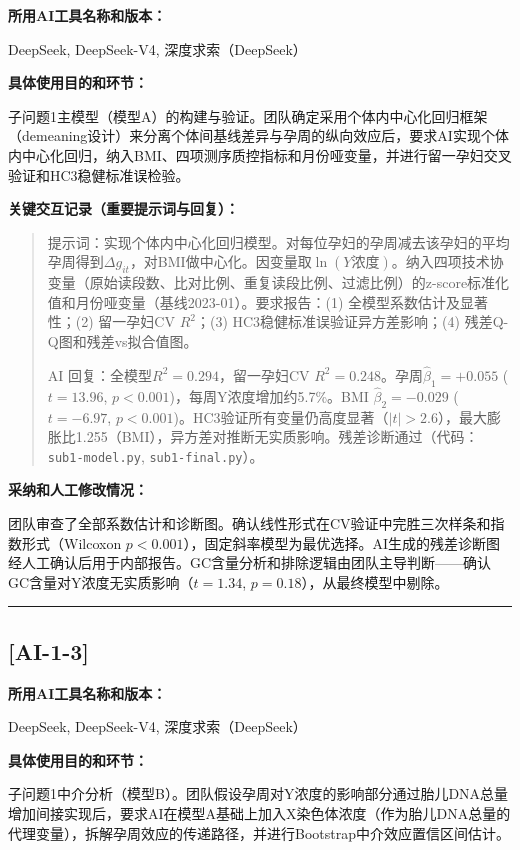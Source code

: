 \documentclass[12pt,a4paper]{ctexart}
\begin{document}
\textbf{所用AI工具名称和版本：}

DeepSeek, DeepSeek-V4, 深度求索（DeepSeek）

\textbf{具体使用目的和环节：}

子问题1主模型（模型A）的构建与验证。团队确定采用个体内中心化回归框架（demeaning设计）来分离个体间基线差异与孕周的纵向效应后，要求AI实现个体内中心化回归，纳入BMI、四项测序质控指标和月份哑变量，并进行留一孕妇交叉验证和HC3稳健标准误检验。

\textbf{关键交互记录（重要提示词与回复）：}

\begin{quote}
提示词：实现个体内中心化回归模型。对每位孕妇的孕周减去该孕妇的平均孕周得到$\Delta g_{it}$，对BMI做中心化。因变量取$\ln(Y\text{浓度})$。纳入四项技术协变量（原始读段数、比对比例、重复读段比例、过滤比例）的z-score标准化值和月份哑变量（基线2023-01）。要求报告：(1) 全模型系数估计及显著性；(2) 留一孕妇CV $R^2$；(3) HC3稳健标准误验证异方差影响；(4) 残差Q-Q图和残差vs拟合值图。

AI 回复：全模型$R^2=0.294$，留一孕妇CV $R^2=0.248$。孕周$\hat{\beta}_1=+0.055$ ($t=13.96$, $p<0.001$)，每周Y浓度增加约5.7\%。BMI $\hat{\beta}_2=-0.029$ ($t=-6.97$, $p<0.001$)。HC3验证所有变量仍高度显著（$|t|>2.6$），最大膨胀比1.255（BMI），异方差对推断无实质影响。残差诊断通过（代码：\texttt{sub1-model.py}, \texttt{sub1-final.py}）。
\end{quote}

\textbf{采纳和人工修改情况：}

团队审查了全部系数估计和诊断图。确认线性形式在CV验证中完胜三次样条和指数形式（Wilcoxon $p<0.001$），固定斜率模型为最优选择。AI生成的残差诊断图经人工确认后用于内部报告。GC含量分析和排除逻辑由团队主导判断——确认GC含量对Y浓度无实质影响（$t=1.34$, $p=0.18$），从最终模型中剔除。

\vspace{1em}
\hrule
\vspace{1em}

\subsection*{[AI-1-3]}

\textbf{所用AI工具名称和版本：}

DeepSeek, DeepSeek-V4, 深度求索（DeepSeek）

\textbf{具体使用目的和环节：}

子问题1中介分析（模型B）。团队假设孕周对Y浓度的影响部分通过胎儿DNA总量增加间接实现后，要求AI在模型A基础上加入X染色体浓度（作为胎儿DNA总量的代理变量），拆解孕周效应的传递路径，并进行Bootstrap中介效应置信区间估计。
\end{document}
